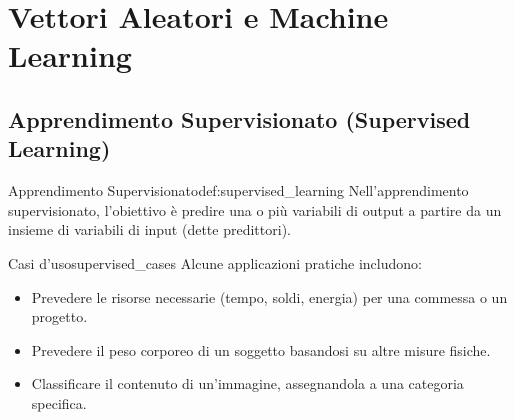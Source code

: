 \section{Vettori Aleatori e Machine Learning}\label{sec:va_ml}

\subsection{Apprendimento Supervisionato (Supervised Learning)}

\begin{definizione}{Apprendimento Supervisionato}{def:supervised_learning}
Nell'apprendimento supervisionato, l'obiettivo è predire una o più variabili di output a partire da un insieme di variabili di input (dette predittori).
\end{definizione}

\begin{esempio}{Casi d'uso}{supervised_cases}
Alcune applicazioni pratiche includono:
\begin{itemize}
    \item Prevedere le risorse necessarie (tempo, soldi, energia) per una commessa o un progetto.
    \item Prevedere il peso corporeo di un soggetto basandosi su altre misure fisiche.
    \item Classificare il contenuto di un'immagine, assegnandola a una categoria specifica.
\end{itemize}
\end{esempio}

